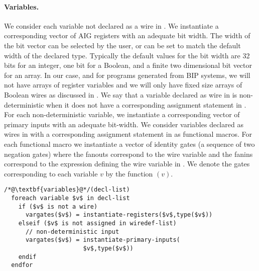 \paragraph{Variables.} 
%
We consider each variable not declared as a wire 
in .
We instantiate a corresponding 
vector of AIG registers with an adequate bit width. 
The width of the bit vector can be selected by the user, 
or can be set to match the default width of the declared type. 
Typically the default values for the bit width are 
32 bits for an integer, one bit for a Boolean, and a 
finite two dimensional bit vector for an array. 
In our case, and for \caig programs generated from BIP systems, 
we will not have arrays of register variables
and we will only have fixed size arrays of Boolean wires as 
discussed in .
%
We say that a variable declared as wire in 
is non-deterministic when it does not have a corresponding assignment statement in . 
For each non-deterministic variable, we instantiate a corresponding
vector of primary inputs with an adequate bit-width. 
%
We consider variables declared as wires in  with 
a corresponding assignment statement in  as functional macros. 
For each functional macro we 
instantiate a vector of identity gates (a sequence of two negation gates) 
where the fanouts correspond to the wire variable and the fanins correspond to
the expression defining the wire variable in . 
%
We denote the gates corresponding to each variable $v$ by the function $(v)$. 

\begin{lstlisting}
/*@\textbf{variables}@*/(decl-list)
  foreach variable $v$ in decl-list
    if ($v$ is not a wire) 
      vargates($v$) = instantiate-registers($v$,type($v$))
    elseif ($v$ is not assigned in wiredef-list) 
      // non-deterministic input
      vargates($v$) = instantiate-primary-inputs(
                      $v$,type($v$))
    endif
  endfor
\end{lstlisting}
%
